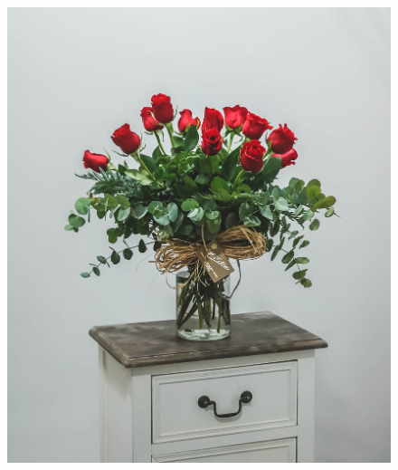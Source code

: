 \begin{figure}[H]
\begin{minipage}{0.3\textwidth}
 \caption{ }
 \label{fig:6}
\end{minipage}
\end{figure}

\begin{figure}[H]
\centering
\begin{minipage}{0.3\textwidth}%
 \includegraphics[width=\textwidth]{Graphics/Images/image_7.jpg}
 \caption{ }
 \label{fig:7}
\end{minipage}%
\begin{minipage}{0.3\textwidth}

\end{minipage}
\end{figure}
